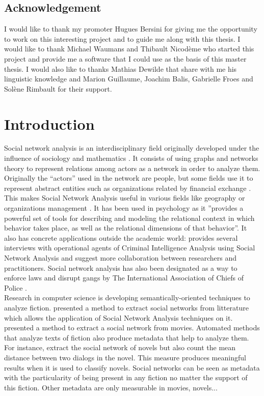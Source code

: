 \documentclass[a4paper, 12pt]{report}
\begin{document}
\newpage
\section*{Acknowledgement}
I would like to thank my promoter Hugues Bersini for giving me the opportunity to work on this interesting project and to guide me along with this thesis. I would like to thank Michael Waumans and Thibault Nicodème who started this project and provide me a software that I could use as the basis of this master thesis. I would also like to thanks Mathias Dewilde that share with me his linguistic knowledge and Marion Guillaume, Joachim Balis, Gabrielle Froes and Solène Rimbault for their support.
\tableofcontents

\chapter{Introduction}
Social network analysis is an interdisciplinary field originally developed under the influence of sociology and mathematics \citep{history_social}. It consists of using graphs and networks theory to represent relations among actors as a network in order to analyze them. Originally the ``actors'' used in the network are people, but some fields use it to represent abstract entities such as organizations related by financial exchange \citep{general_sna}. This makes Social Network Analysis useful in various fields like geography \citep{economic_geography} or organizations management \citep{management}. It has been used in psychology \citep{psy} as it ''provides a powerful set of tools for describing and modeling the relational context in which behavior takes place, as well as the relational dimensions of that behavior''\citep{intro}. It also has concrete applications outside the academic world: \cite{criminal} provides several interviews with operational agents of Criminal Intelligence Analysis using Social Network Analysis and suggest more collaboration between researchers and practitioners. Social network analysis has also been designated as a way to enforce laws and disrupt gangs by The International Association of Chiefs of Police \citep{police}. \\

Research in computer science is developing semantically-oriented techniques to analyze fiction. \cite{character_country} presented a method to extract social networks from litterature which allows the application of Social Network Analysis techniques on it. \cite{movie} presented a method to extract a social network from movies. Automated methods that analyze texts of fiction also produce metadata that help to analyze them. For instance, \cite{original} extract the social network of novels but also count the mean distance between two dialogs in the novel. This measure produces meaningful results when it is used to classify novels. Social networks can be seen as metadata with the particularity of being present in any fiction no matter the support of this fiction. Other metadata are only measurable in movies, novels... \\
\end{document}
